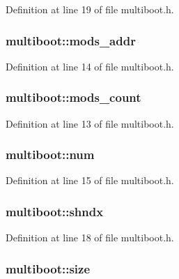 Definition at line 19 of file multiboot.\-h.

\hypertarget{structmultiboot_ac64fd6bca4d231cbb450ba685a2b3400}{
\subsubsection[{mods\-\_\-addr}]{ multiboot\-::mods\-\_\-addr}}\label{structmultiboot_ac64fd6bca4d231cbb450ba685a2b3400}


Definition at line 14 of file multiboot.\-h.

\hypertarget{structmultiboot_a96f82c08b21585317616beeacde278cc}{
\subsubsection[{mods\-\_\-count}]{ multiboot\-::mods\-\_\-count}}\label{structmultiboot_a96f82c08b21585317616beeacde278cc}


Definition at line 13 of file multiboot.\-h.

\hypertarget{structmultiboot_a6760a249410286719d6eec4e6074bdd6}{
\subsubsection[{num}]{ multiboot\-::num}}\label{structmultiboot_a6760a249410286719d6eec4e6074bdd6}


Definition at line 15 of file multiboot.\-h.

\hypertarget{structmultiboot_a62d5ef63cc8db466e77e24a7bcc0fea3}{
\subsubsection[{shndx}]{ multiboot\-::shndx}}\label{structmultiboot_a62d5ef63cc8db466e77e24a7bcc0fea3}


Definition at line 18 of file multiboot.\-h.

\hypertarget{structmultiboot_a9f1d21c3f7b3071d7362b02dbc3f17e4}{
\subsubsection[{size}]{ multiboot\-::size}}\label{structmultiboot_a9f1d21c3f7b3071d7362b02dbc3f17e4}


